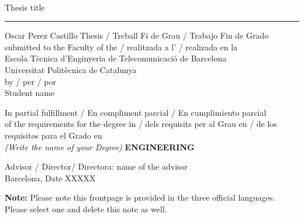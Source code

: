 \thispagestyle{empty}
\begin{center}
    {\sffamily
        \\
        \vspace{1cm}
        {\Huge Thesis title}\\
        \vspace{0.5cm}
        {\color{black}\hrule height 1pt}
        \vspace{1cm}
        {\large{Oscar Perez Castillo Thesis / Treball Fi de Grau / Trabajo Fin de Grado\\
                submitted to the Faculty of the / realitzada a l' / realizada en la \\
                Escola T\`ecnica d'Enginyeria de Telecomunicaci\'o de Barcelona \\
                Universitat Polit\`ecnica de Catalunya \\
                by / per / por \\
                \vspace{0.5cm}
                Student name}}

        \vspace{1.5cm}

        {In partial fulfillment / En compliment parcial / En cumplimiento parcial\\
            of the requirements for the degree in / dels requisits per al Grau en / de los requisitos para el Grado en \\
            \textit{(Write the name of your Degree)} \textbf{ENGINEERING}}

        \vspace{2cm}

        {{Advisor / Director/ Directora: name of the advisor\\}}
        {{Barcelona, Date XXXXX}}

        \vspace{2cm}

        {\color{red} \textbf{Note:} Please note this frontpage is provided in the three official languages. Please select one and delete this note as well.}
        \thispagestyle{alim}
    }

\end{center}
